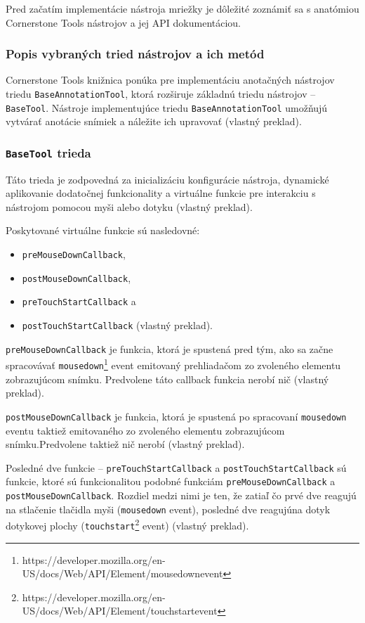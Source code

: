 Pred začatím implementácie nástroja mriežky je dôležité zoznámiť sa s anatómiou Cornerstone Tools nástrojov a jej API dokumentáciou.

\subsubsection {Popis vybraných tried nástrojov a ich metód}
Cornerstone Tools knižnica ponúka pre implementáciu anotačných nástrojov triedu \texttt{BaseAnnotationTool}, ktorá rozširuje základnú triedu nástrojov -- \texttt{BaseTool}. Nástroje implementujúce triedu \texttt{BaseAnnotationTool} umožňujú vytvárať anotácie snímiek a náležite ich upravovať \cite{base_tool_description} (vlastný preklad).

\subsubsection* {\texttt{BaseTool} trieda}
Táto trieda je zodpovedná za inicializáciu konfigurácie nástroja, dynamické aplikovanie dodatočnej funkcionality a virtuálne funkcie pre interakciu s nástrojom pomocou myši alebo dotyku \cite{base_tool_description} (vlastný preklad).

Poskytované virtuálne funkcie sú nasledovné:
\begin {itemize}
\item {\texttt{preMouseDownCallback},}
\item {\texttt{postMouseDownCallback},}
\item {\texttt{preTouchStartCallback} a}
\item {\texttt{postTouchStartCallback} \cite{base_tool_description} (vlastný preklad).}
\end {itemize}

\texttt{preMouseDownCallback} je funkcia, ktorá je spustená pred tým, ako sa začne spracovávať \texttt{mousedown}\footnote{https://developer.mozilla.org/en-US/docs/Web/API/Element/mousedown\textunderscore event} event emitovaný prehliadačom zo zvoleného elementu zobrazujúcom snímku. Predvolene táto callback funkcia nerobí nič \cite{base_tool_description} (vlastný preklad).

\texttt{postMouseDownCallback} je funkcia, ktorá je spustená po spracovaní \texttt{mousedown} eventu taktiež emitovaného zo zvoleného elementu zobrazujúcom snímku.\newline Predvolene taktiež nič nerobí \cite{base_tool_description} (vlastný preklad).

Posledné dve funkcie -- \texttt{preTouchStartCallback} a \texttt{postTouchStartCallback} sú funkcie, ktoré sú funkcionalitou podobné funkciám \texttt{preMouseDownCallback} a \texttt{postMouseDownCallback}. Rozdiel medzi nimi je ten, že zatiaľ čo prvé dve reagujú na stlačenie tlačidla myši (\texttt{mousedown} event), posledné dve reagujú\newline na dotyk dotykovej plochy (\texttt{touchstart}\footnote{https://developer.mozilla.org/en-US/docs/Web/API/Element/touchstart\textunderscore event} event) \cite{base_tool_description} (vlastný preklad).

